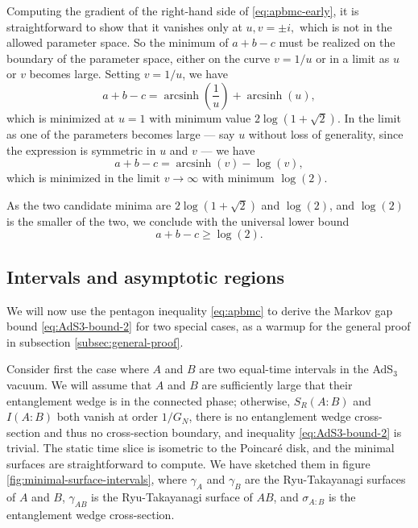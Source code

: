 \documentclass[a4paper,11pt]{article}
\newcommand{\arcsinh}{\operatorname{arcsinh}}
\begin{document}
Computing the gradient of the right-hand side of \eqref{eq:apbmc-early}, it is straightforward to show that it vanishes only at $u, v = \pm i,$ which is not in the allowed parameter space. So the minimum of $a + b - c$ must be realized on the boundary of the parameter space, either on the curve $v = 1/u$ or in a limit as $u$ or $v$ becomes large. Setting $v = 1/u$, we have
\begin{equation}
    a + b - c = \arcsinh\left(\frac{1}{u}\right) + \arcsinh(u),
\end{equation}
which is minimized at $u=1$ with minimum value $2 \log(1 + \sqrt{2}).$ In the limit as one of the parameters becomes large --- say $u$ without loss of generality, since the expression is symmetric in $u$ and $v$ --- we have
\begin{equation}
    a + b - c = \arcsinh(v) - \log(v),
\end{equation}
which is minimized in the limit $v \rightarrow \infty$ with minimum $\log(2).$

As the two candidate minima are $2 \log(1 + \sqrt{2})$ and $\log(2)$, and $\log(2)$ is the smaller of the two, we conclude with the universal lower bound
\begin{equation} \label{eq:apbmc}
    a + b - c \geq \log(2).
\end{equation}

\subsection{Intervals and asymptotic regions}
\label{subsec:two-special-cases}

We will now use the pentagon inequality \eqref{eq:apbmc} to derive the Markov gap bound \eqref{eq:AdS3-bound-2} for two special cases, as a warmup for the general proof in subsection \ref{subsec:general-proof}.

Consider first the case where $A$ and $B$ are two equal-time intervals in the AdS$_3$ vacuum. We will assume that $A$ and $B$ are sufficiently large that their entanglement wedge is in the connected phase; otherwise, $S_R(A:B)$ and $I(A:B)$ both vanish at order $1/G_N$, there is no entanglement wedge cross-section and thus no cross-section boundary, and inequality \eqref{eq:AdS3-bound-2} is trivial. The static time slice is isometric to the Poincar\'{e} disk, and the minimal surfaces are straightforward to compute. We have sketched them in figure \ref{fig:minimal-surface-intervals}, where $\gamma_A$ and $\gamma_B$ are the Ryu-Takayanagi surfaces of $A$ and $B$, $\gamma_{AB}$ is the Ryu-Takayanagi surface of $AB$, and $\sigma_{A:B}$ is the entanglement wedge cross-section.
\end{document}
